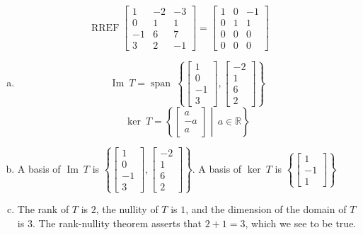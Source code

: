 \begin{exerciseAnswer} 


\[\operatorname{RREF} \left[\begin{array}{ccc}
1 & -2 & -3 \\
0 & 1 & 1 \\
-1 & 6 & 7 \\
3 & 2 & -1
\end{array}\right] = \left[\begin{array}{ccc}
1 & 0 & -1 \\
0 & 1 & 1 \\
0 & 0 & 0 \\
0 & 0 & 0
\end{array}\right] \]


\begin{enumerate}[(a)]
\item \[\operatorname{Im}\ T = \operatorname{span}\  \left\{ \left[\begin{array}{c}
1 \\
0 \\
-1 \\
3
\end{array}\right] , \left[\begin{array}{c}
-2 \\
1 \\
6 \\
2
\end{array}\right] \right\} \]\[\operatorname{ker}\ T =  \left\{ \left[\begin{array}{c}
a \\
-a \\
a
\end{array}\right] \middle|\,a\in\mathbb{R}\right\} \]
\item  A basis of \(\operatorname{Im}\ T\) is \( \left\{ \left[\begin{array}{c}
1 \\
0 \\
-1 \\
3
\end{array}\right] , \left[\begin{array}{c}
-2 \\
1 \\
6 \\
2
\end{array}\right] \right\} \). A basis of \(\operatorname{ker}\ T\) is \( \left\{ \left[\begin{array}{c}
1 \\
-1 \\
1
\end{array}\right] \right\} \)
\item  The rank of \(T\) is \( 2 \), the nullity of \(T\) is \( 1 \), and the dimension of the domain of \(T\) is \( 3 \). The rank-nullity theorem asserts that \( 2 + 1 = 3 \), which we see to be true. 
\end{enumerate}
    
\end{exerciseAnswer}
    
